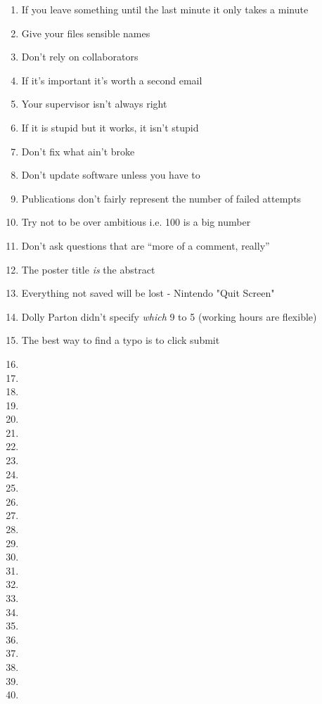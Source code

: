 \begin{enumerate}
	\item If you leave something until the last minute it only takes a minute
	\item Give your files sensible names
	\item Don't rely on collaborators
	\item If it's important it's worth a second email
	\item Your supervisor isn't always right
	\item If it is stupid but it works, it isn't stupid
	\item Don't fix what ain't broke
	\item Don't update software unless you have to
	\item Publications don't fairly represent the number of failed attempts
	\item Try not to be over ambitious i.e. 100 is a big number
	\item Don't ask questions that are ``more of a comment, really''
	\item The poster title \textit{is} the abstract
	\item Everything not saved will be lost - Nintendo "Quit Screen"
	\item Dolly Parton didn't specify \textit{which} 9 to 5 (working hours are flexible)
	\item The best way to find a typo is to click submit
	\item 
	\item 
	\item 
	\item 
	\item 
	\item 
	\item
	\item
	\item
	\item
	\item
	\item
	\item
	\item
	\item
	\item
	\item
	\item
	\item
	\item
	\item
	\item
	\item
	\item
	\item

\end{enumerate}
